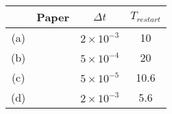 \begin{subtable}{\textwidth}\centering
\begin{tabular}{||c| c c c ||}
  \hline
  & Paper & $\Delta t$ & $T_{restart}$\\
  \hline\hline
  (a) & \cite{lan_all-hex_2021} & $2\times 10^{-3}$ & 10\\
  (b) & \cite{lan_all-hex_2021} & $5\times 10^{-4}$ & 20\\
  (c) & \cite{yuan2020spectral} & $5\times 10^{-5}$ & 10.6\\
  (d) & \cite{shur_direct_2021} & $2\times 10^{-3}$ & 5.6\\
\hline
\end{tabular}
\end{subtable}